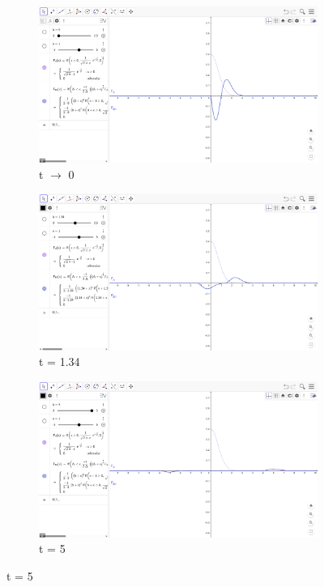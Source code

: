 \documentclass[a4paper,12pt]{article}
\begin{document}
\begin{figure}[H]
    \centering
    \begin{subfigure}[b]{0.4\textwidth}
         \centering
         \includegraphics[width=\textwidth]{fig/Fa0.png}
         \caption{t $\rightarrow$ 0}
         \label{fig:t0}
    \end{subfigure}
    \hfill
    \begin{subfigure}[b]{0.4\textwidth}
         \centering
         \includegraphics[width=\textwidth]{fig/Fa1.png}
         \caption{t = 1.34}
         \label{fig:t1}
    \end{subfigure}
    \hfill
    \begin{subfigure}[b]{0.4\textwidth}
         \centering
         \includegraphics[width=\textwidth]{fig/Fa2.png}
         \caption{t = 5}
         \label{fig:t2}
    \end{subfigure}
\end{figure}
\end{document}
